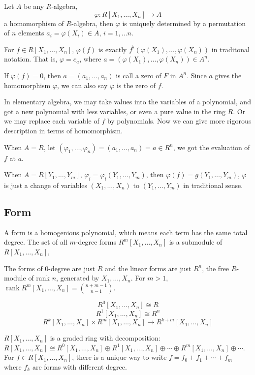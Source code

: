 \documentclass{article}
\def\rank{\mathop{\mathrm{rank}}}
\begin{document}
Let $A$ be any $R$-algebra, $$\varphi : R[X_1, \dots, X_n] \to A$$ a homomorphism of $R$-algebra,
then $\varphi$ is uniquely determined by a permutation of $n$ elements $a_i = \varphi(X_i) \in A$,
$i = 1, \dots n$.

For $f \in R[X_1, \dots, X_n]$, $\varphi(f)$ is exactly $f^\flat(\varphi(X_1), \dots, \varphi(X_n))$
in traditonal notation. That is, $\varphi = e_a$, where $a = (\varphi(X_1), \dots, \varphi(X_n)) \in A^n$.

If $\varphi(f) = 0$, then $a = (a_1, \dots, a_n)$ is call a zero of $F$ in $A^n$.
Since $a$ gives the homomorphism $\varphi$, we can also say $\varphi$ is the zero of $f$.

In elementary algebra, we may take values into the variables of a polynomial, and got a new polynomial
with less variables, or even a pure value in the ring $R$. Or we may replace each variable of $f$ by
polynomials. Now we can give more rigorous description in terms of homomorphism.

When $A = R$, let $(\varphi_1, \dots, \varphi_n) = (a_1, \dots, a_n) = a \in R^n$,
we got the evaluation of $f$ at $a$.

When $A = R[Y_1, \dots, Y_m]$, $\varphi_i = \varphi_i(Y_1, \dots, Y_m)$,
then $\varphi(f) = g(Y_1, \dots, Y_m)$, $\varphi$ is just a change of variables
$(X_1, \dots, X_n)$ to $(Y_1, \dots, Y_m)$ in traditional sense.


\subsection{Form}
A form is a homogenious polynomial, which means each term has the same total degree.
The set of all $m$-degree forms $R^m[X_1, \dots, X_n]$ is a submodule of $R[X_1, \dots, X_n]$,

The forms of $0$-degree are just $R$ and the linear forms are just $R^n$,
the free $R$-module of rank $n$, generated by $X_1, \dots, X_n$.
For $m > 1$, $\rank R^m[X_1, \dots, X_n] = {n + m - 1\choose n - 1}$.

$$R^0[X_1, \dots, X_n] \cong R$$
$$R^1[X_1, \dots, X_n] \cong R^n$$
$$R^k[X_1, \dots, X_n] \times R^m[X_1, \dots, X_n] \to R^{k+m}[X_1, \dots, X_n]$$

$R[X_1, \dots, X_n]$ is a graded ring with decomposition:
$R[X_1, \dots, X_n] \cong R^0[X_1, \dots, X_n] \oplus R^1[X_1, \dots, X_n] \oplus
\cdots \oplus R^m[X_1, \dots, X_n] \oplus \cdots$.
For $f \in R[X_1, \dots, X_n]$, there is a unique way to write
$f = f_0 + f_1 + \cdots + f_m$ where $f_k$ are forms with different degree.
\end{document}
